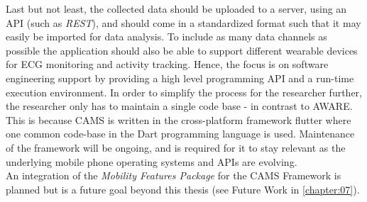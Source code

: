 Last but not least, the collected data should be uploaded to a server, using an API (such as \textit{REST}), and should come in a standardized format such that it may easily be imported for data analysis. To include as many data channels as possible the application should also be able to support different wearable devices for ECG monitoring and activity tracking. Hence, the focus is on software engineering support by providing a high level programming API and a run-time execution environment. In order to simplify the process for the researcher further, the researcher only has to maintain a single code base - in contrast to AWARE. This is because CAMS  is written in the cross-platform framework flutter where one common code-base in the Dart programming language is used. Maintenance of the framework will be ongoing, and is required for it to stay relevant as the underlying mobile phone operating systems and APIs are evolving. \\

An integration of the \textit{Mobility Features Package} for the CAMS Framework is planned but is a future goal beyond this thesis (see Future Work in \ref{chapter:07}).